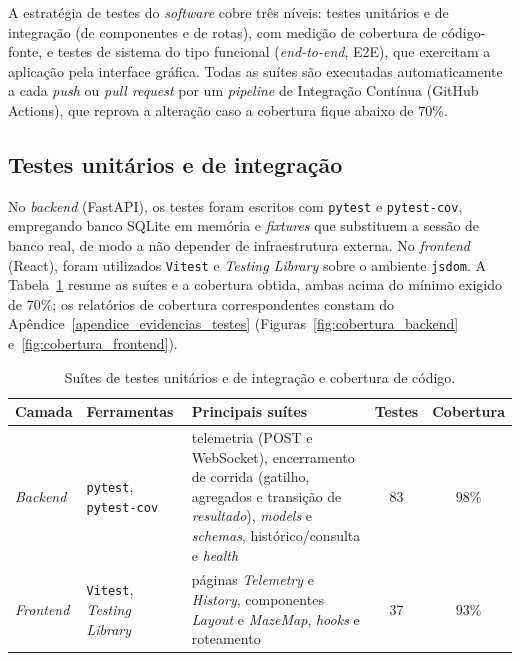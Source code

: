 A estratégia de testes do \textit{software} cobre três níveis: testes unitários e de
integração (de componentes e de rotas), com medição de cobertura de código-fonte, e
testes de sistema do tipo funcional (\textit{end-to-end}, E2E), que exercitam a
aplicação pela interface gráfica. Todas as suítes são executadas automaticamente a
cada \textit{push} ou \textit{pull request} por um \textit{pipeline} de Integração
Contínua (GitHub Actions), que reprova a alteração caso a cobertura fique abaixo de
$70\%$.

\subsection{Testes unitários e de integração}

No \textit{backend} (FastAPI), os testes foram escritos com \texttt{pytest} e
\texttt{pytest-cov}, empregando banco SQLite em memória e \textit{fixtures} que
substituem a sessão de banco real, de modo a não depender de infraestrutura externa.
No \textit{frontend} (React), foram utilizados \texttt{Vitest} e \textit{Testing
Library} sobre o ambiente \texttt{jsdom}. A Tabela~\ref{tab:suites_unit} resume as
suítes e a cobertura obtida, ambas acima do mínimo exigido de $70\%$; os relatórios
de cobertura correspondentes constam do Apêndice~\ref{apendice_evidencias_testes}
(Figuras~\ref{fig:cobertura_backend} e~\ref{fig:cobertura_frontend}).

\begin{table}[H]
    \centering
    \caption{Suítes de testes unitários e de integração e cobertura de código.}
    \label{tab:suites_unit}
    \small
    \begin{tabular}{|l|p{3.0cm}|p{5.2cm}|c|c|}
        \hline
        \textbf{Camada} & \textbf{Ferramentas} & \textbf{Principais suítes} &
        \textbf{Testes} & \textbf{Cobertura} \\ \hline
        \textit{Backend} & \texttt{pytest}, \texttt{pytest-cov} &
        telemetria (POST e WebSocket), encerramento de corrida (gatilho,
        agregados e transição de \textit{resultado}), \textit{models} e
        \textit{schemas}, histórico/consulta e \textit{health} & 83 & $98\%$ \\ \hline
        \textit{Frontend} & \texttt{Vitest}, \textit{Testing Library} &
        páginas \textit{Telemetry} e \textit{History}, componentes \textit{Layout} e
        \textit{MazeMap}, \textit{hooks} e roteamento & 37 & $93\%$ \\ \hline
    \end{tabular}
\end{table}

